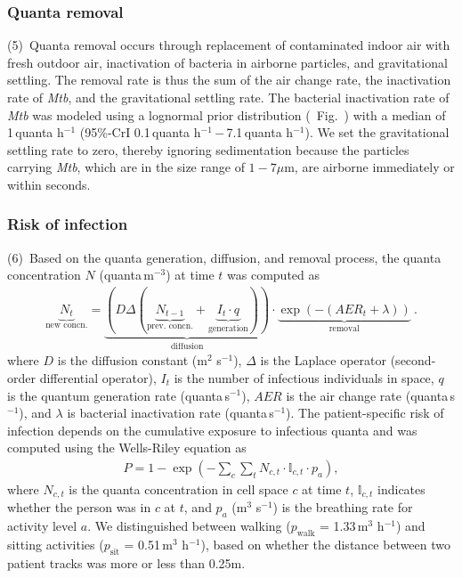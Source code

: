 \documentclass[fleqn,11pt]{wlscirep}
\begin{document}
\subsubsection*{Quanta removal}

(5)~Quanta removal occurs through replacement of contaminated indoor air with fresh outdoor air, inactivation of bacteria in airborne particles, and gravitational settling. The removal rate is thus the sum of the air change rate, the inactivation rate of \emph{Mtb}, and the gravitational settling rate. The bacterial inactivation rate of \emph{Mtb} was modeled using a lognormal prior distribution (\supp~Fig.~) with a median of 1\,quanta h$^{-1}$ (95\%-CrI 0.1\,quanta h$^{-1}$\,$-$\,7.1\,quanta h$^{-1}$)\cite{Loudon1969AMRRD,Lever2000LettersAppliedMicrobio,Gannon2007ResVetSci,Klein2014IJMyco}. We set the gravitational settling rate to zero, thereby ignoring sedimentation because the particles carrying \emph{Mtb}, which are in the size range of $1-7\mu$m\cite{Fennelly2020Lancet}, are airborne immediately or within seconds\cite{Vuorinen2020SafSci}.

\subsubsection*{Risk of infection}

(6)~Based on the quanta generation, diffusion, and removal process, the quanta concentration $N$ (quanta\,m$^{-3}$) at time $t$ was computed as 
\begin{align}\label{eq:spattemp-N}
    \underbrace{N_{t}}_{\text{new concn.}} = \underbrace{\left(D \Delta (\underbrace{N_{t-1}}_{\text{prev. concn.}} + \underbrace{I_t \cdot q}_{\text{generation}})\right)}_{\text{diffusion}} \cdot \underbrace{\exp\left(-(AER_t + \lambda)\right)}_{\text{removal}} ~.
\end{align}
where $D$ is the diffusion constant (m$^2$ s$^{-1}$), $\Delta$ is the Laplace operator (second-order differential operator), $I_t$ is the number of infectious individuals in space, $q$ is the quantum generation rate (quanta\,s$^{-1}$), $AER$ is the air change rate (quanta\,s$^{-1}$), and $\lambda$ is bacterial inactivation rate (quanta\,s$^{-1}$). The patient-specific risk of infection depends on the cumulative exposure to infectious quanta and was computed using the Wells-Riley equation as
\begin{align}
    P = 1-\exp\left(-\sum_c \sum_t N_{c,t} \cdot \mathbb{I}_{c,t} \cdot p_a\right),
\end{align}
where $N_{c,t}$ is the quanta concentration in cell space $c$ at time $t$, $\mathbb{I}_{c,t}$ indicates whether the person was in $c$ at $t$, and $p_a$ (m$^3$ s$^{-1}$) is the breathing rate for activity level $a$. We distinguished between walking ($p_\mathrm{walk}$ = 1.33\,m$^3$ h$^{-1}$) and sitting activities ($p_\mathrm{sit}$ = 0.51\,m$^3$ h$^{-1}$)\cite{Adams1993}, based on whether the distance between two patient tracks was more or less than 0.25m.
\end{document}
